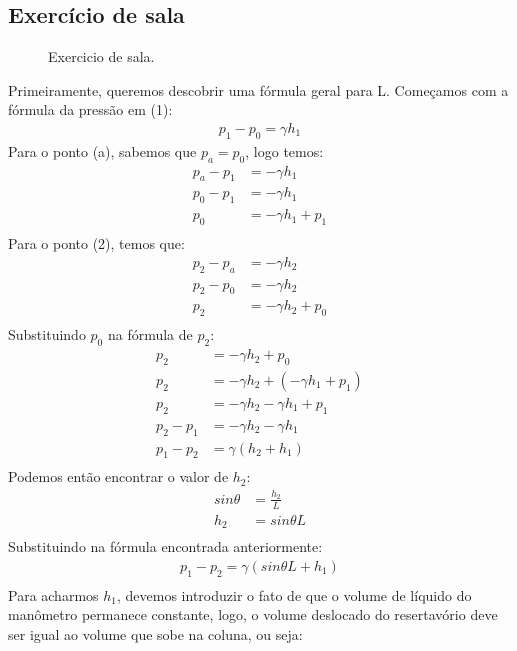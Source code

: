 \documentclass{article}
\begin{document}
\newpage
\subsection{Exercício de sala}

\begin{figure}[!h]
     \centering
     \def\svgwidth{0.4\textwidth}
     
     \caption{\label{fig:exercicioSala} Exercicio de sala.}
     \hfill
\end{figure}
Primeiramente, queremos descobrir uma fórmula geral para L. Começamos com a fórmula da pressão em (1):
\begin{align*}
     p_1-p_0=\gamma h_1
\end{align*}
Para o ponto (a), sabemos que $p_a=p_0$, logo temos:
\begin{align*}
     p_a-p_1&=-\gamma h_1\\
     p_0-p_1&=-\gamma h_1\\
     p_0&=-\gamma h_1+p_1\\
\end{align*}
Para o ponto (2), temos que:
\begin{align*}
     p_2-p_a&=-\gamma h_2\\
     p_2-p_0&=-\gamma h_2\\
     p_2&=-\gamma h_2+p_0\\
\end{align*}
Substituindo $p_0$ na fórmula de $p_2$:
\begin{align*}
     p_2&=-\gamma h_2+p_0\\
     p_2&=-\gamma h_2+(-\gamma h_1+p_1)\\  
     p_2&=-\gamma h_2-\gamma h_1+p_1\\           
     p_2-p_1&=-\gamma h_2-\gamma h_1\\
     p_1-p_2&=\gamma(h_2+h_1)\\
\end{align*}
Podemos então encontrar o valor de $h_2$:
\begin{align*}
     sin\theta&=\frac{h_2}{L}\\
     h_2&=sin\theta L\\
\end{align*}
Substituindo na fórmula encontrada anteriormente:
\begin{align*}
     p_1-p_2=\gamma(sin\theta L + h_1)\\
\end{align*}
Para acharmos $h_1$, devemos introduzir o fato de que o volume de líquido do manômetro permanece constante, logo, o volume deslocado do resertavório deve ser igual ao volume que sobe na coluna, ou seja:
\end{document}
